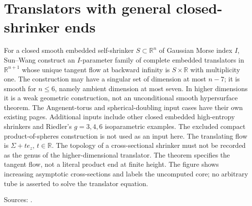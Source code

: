 \chapter{Translators with general closed-shrinker ends}\label{sec:catalogue-sun-wang-prescribed-ends}
\begin{example}\label{ex:catalogue-sun-wang-prescribed-ends}
For a closed smooth embedded self-shrinker $S\subset\mathbb R^n$ of Gaussian Morse index $I$, Sun--Wang construct an $I$-parameter family of complete embedded translators in $\mathbb R^{n+1}$ whose unique tangent flow at backward infinity is $S\times\mathbb R$ with multiplicity one. The construction may have a singular set of dimension at most $n-7$; it is smooth for $n\le6$, namely ambient dimension at most seven. In higher dimensions it is a weak geometric construction, not an unconditional smooth hypersurface theorem.
The Angenent-torus and spherical-doubling input cases have their own existing pages. Additional inputs include other closed embedded high-entropy shrinkers and Riedler's $g=3,4,6$ isoparametric examples. The excluded compact product-of-spheres construction is not used as an input here. The translating flow is $\Sigma+te_z$, $t\in\mathbb R$. The topology of a cross-sectional shrinker must not be recorded as the genus of the higher-dimensional translator. The theorem specifies the tangent flow, not a literal product end at finite height. The figure shows increasing asymptotic cross-sections and labels the uncomputed core; no arbitrary tube is asserted to solve the translator equation.
\par Sources: \cite{CatSunWang2025}.
\end{example}

